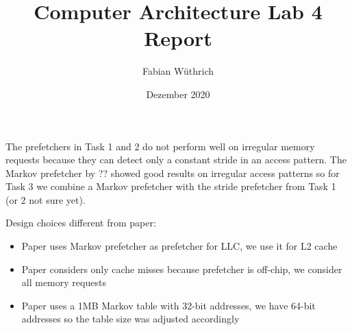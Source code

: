 \documentclass[a4paper]{article}
\begin{document}
\title{Computer Architecture Lab 4 Report}
\author{Fabian Wüthrich}
\date{Dezember 2020}
\maketitle

The prefetchers in Task 1 and 2 do not perform well on irregular memory requests
because they can detect only a constant stride in an access pattern.
The Markov prefetcher by ?? showed good results on irregular access patterns
so for Task 3 we combine a Markov prefetcher with the stride
prefetcher from Task 1 (or 2 not sure yet).

Design choices different from paper:
\begin{itemize}
    \item Paper uses Markov prefetcher as prefetcher for LLC, we use it for L2
        cache
    \item Paper considers only cache misses because prefetcher is off-chip, we
        consider all memory requests
    \item Paper uses a 1MB Markov table with 32-bit addresses, we have 64-bit
        addresses so the table size was adjusted accordingly
\end{itemize}
\end{document}
